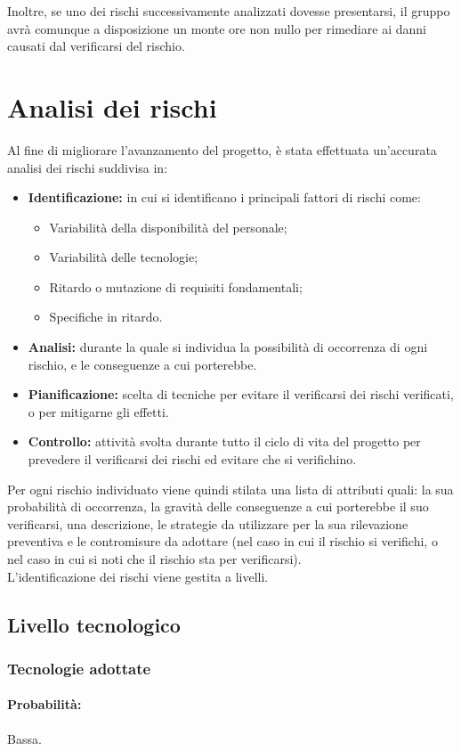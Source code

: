 \documentclass[a4paper]{report}
\newcommand{\mychapter}[2]{
	\setcounter{chapter}{#1}
	\setcounter{section}{0}
	\setcounter{subsection}{1}
	\chapter*{#2}
	\addcontentsline{toc}{chapter}{#2}
}
\begin{document}
				Inoltre, se uno dei rischi successivamente analizzati dovesse presentarsi, il gruppo avrà comunque a disposizione 
				un monte ore non nullo per rimediare ai danni causati dal verificarsi del rischio.
	\mychapter{5}{Analisi dei rischi}
		Al fine di migliorare l'avanzamento del progetto, è stata effettuata un'accurata analisi dei rischi suddivisa in:
		\begin{itemize}
			\item \textbf{Identificazione:} in cui si identificano i principali fattori di rischi come:
			\begin{itemize}
				\item Variabilità della disponibilità del personale;
				\item Variabilità delle tecnologie;
				\item Ritardo o mutazione di requisiti fondamentali;
				\item Specifiche in ritardo.
			\end{itemize}
			\item \textbf{Analisi:} durante la quale si individua la possibilità di occorrenza di ogni rischio, e le conseguenze a cui porterebbe.
			\item \textbf{Pianificazione:} scelta di tecniche per evitare il verificarsi dei rischi verificati, o per mitigarne gli effetti.
			\item \textbf{Controllo:} attività svolta durante tutto il ciclo di vita del progetto per prevedere il verificarsi dei rischi
			ed evitare che si verifichino.
		\end{itemize}
		Per ogni rischio individuato viene quindi stilata una lista di attributi quali: la sua probabilità di occorrenza, la gravità delle 
		conseguenze a cui porterebbe il suo verificarsi, una descrizione, le strategie da utilizzare per la sua rilevazione preventiva e le 
		contromisure da adottare (nel caso in cui il rischio si verifichi, o nel caso in cui si noti che il rischio sta per verificarsi). \\
		L'identificazione dei rischi viene gestita a livelli.
		
		\section{Livello tecnologico}
			\subsection{Tecnologie adottate}
				\subsubsection{Probabilità:}
					Bassa.
\end{document}
